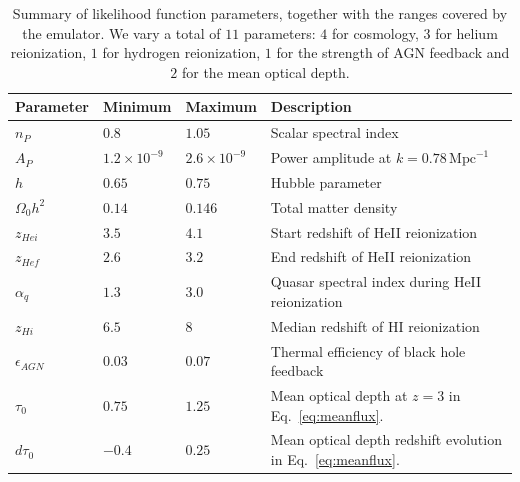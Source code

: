 \begin{table}
\begin{centering}
  \begin{tabular}{llll}
  \hline
  Parameter & Minimum & Maximum & Description \\
    \hline
    $n_P$  &  $0.8$  & $1.05$ & Scalar spectral index \\
    $A_P$  &  $1.2 \times 10^{-9}$  & $2.6 \times 10^{-9}$ & Power amplitude at $k = 0.78 \,\mathrm{Mpc}^{-1}$ \\
    $h$    & $0.65$  & $0.75$ & Hubble parameter \\
    $\Omega_0 h^2$ & $0.14$ & $0.146$ & Total matter density \\
    $z_{Hei}$      & $3.5$  & $4.1$  & Start redshift of HeII reionization \\
    $z_{Hef}$      & $2.6$  & $3.2$  & End redshift of HeII reionization \\
    $\alpha_q$     & $1.3$  & $3.0$ & Quasar spectral index during HeII reionization  \\
    $z_{Hi}$        & $6.5$ & $8$   & Median redshift of HI reionization \\
    $\epsilon_{AGN}$ & $0.03$ & $0.07$ & Thermal efficiency of black hole feedback \\
    $\tau_0$ & $0.75$ & $1.25$ & Mean optical depth at $z=3$ in Eq.~\ref{eq:meanflux}.\\
    $d \tau_0$ & $-0.4$ & $0.25$ & Mean optical depth redshift evolution in Eq.~\ref{eq:meanflux}. \\
    \hline
  \end{tabular}
  \caption{Summary of likelihood function parameters, together with the ranges covered by the emulator. We vary a total of $11$ parameters: $4$ for cosmology, $3$ for helium reionization, $1$ for hydrogen reionization, $1$ for the strength of AGN feedback and $2$ for the mean optical depth.}
  \label{tab:emulatorparams}
  \end{centering}
\end{table}

